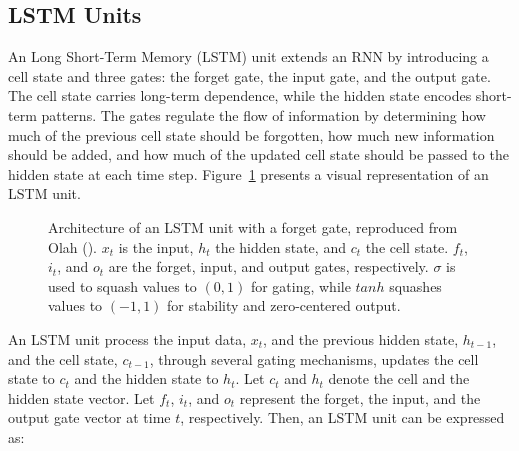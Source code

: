 \documentclass[
  letterpaper,
  double,
  12pt,
  1.0in]{beavtex}
\begin{document}
\subsection{LSTM Units}\label{sec-ch3-background-lstm}

An Long Short-Term Memory (LSTM) unit extends an RNN by introducing a
cell state and three gates: the forget gate, the input gate, and the
output gate. The cell state carries long-term dependence, while the
hidden state encodes short-term patterns. The gates regulate the flow of
information by determining how much of the previous cell state should be
forgotten, how much new information should be added, and how much of the
updated cell state should be passed to the hidden state at each time
step. Figure~\ref{fig-lstm} presents a visual representation of an LSTM
unit.

\begin{figure}


\caption{\label{fig-lstm}Architecture of an LSTM unit with a forget
gate, reproduced from Olah
(). \(x_t\) is the input,
\(h_t\) the hidden state, and \(c_t\) the cell state. \(f_t\), \(i_t\),
and \(o_t\) are the forget, input, and output gates, respectively.
\(\sigma\) is used to squash values to \((0, 1)\) for gating, while
\(tanh\) squashes values to \((-1, 1)\) for stability and zero-centered
output.}

\end{figure}%

An LSTM unit process the input data, \(x_t\), and the previous hidden
state, \(h_{t-1}\), and the cell state, \(c_{t-1}\), through several
gating mechanisms, updates the cell state to \(c_t\) and the hidden
state to \(h_t\). Let \(c_t\) and \(h_t\) denote the cell and the hidden
state vector. Let \(f_t\), \(i_t\), and \(o_t\) represent the forget,
the input, and the output gate vector at time \(t\), respectively. Then,
an LSTM unit can be expressed as:
\end{document}
